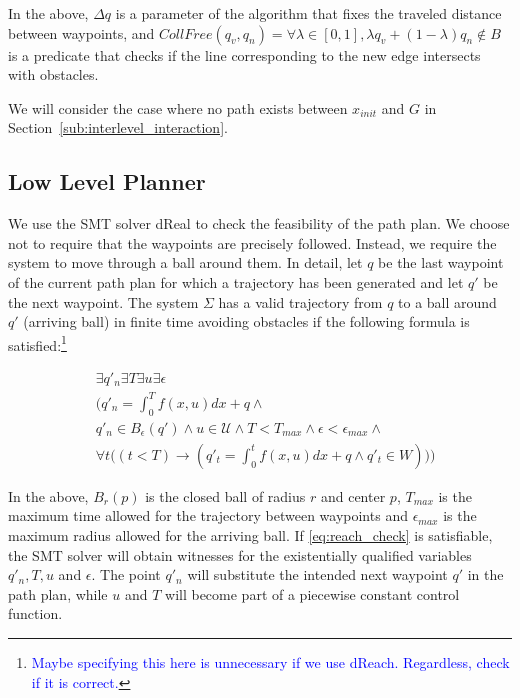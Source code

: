 \documentclass[12pt]{article}
\newcommand\fran[1]{\textcolor{blue}{#1}}
\newcommand\ffran[1]{\textcolor{blue}{\footnote{\fran{#1}}}}
\begin{document}
In the above, $\Delta q$ is a parameter of the algorithm that fixes the traveled distance between waypoints, and $CollFree(q_v, q_n) = \forall \lambda \in [0, 1], \lambda q_v + (1 - \lambda) q_n \notin B$ is a predicate that checks if the line corresponding to the new edge intersects with obstacles.

We will consider the case where no path exists between $x_{init}$ and $G$ in Section~\ref{sub:interlevel_interaction}.

\subsection{Low Level Planner}
\label{sub:low_level_planner}

We use the SMT solver dReal to check the feasibility of the path plan. We choose not to require that the waypoints are precisely followed. Instead, we require the system to move through a ball around them. In detail, let $q$ be the last waypoint of the current path plan for which a trajectory has been generated and let $q'$ be the next waypoint. The system $\Sigma$ has a valid trajectory from $q$ to a ball around $q'$ (arriving ball) in finite time avoiding obstacles if the following formula is satisfied:\ffran{Maybe specifying this here is unnecessary if we use dReach. Regardless, check if it is correct.}

\begin{equation}
    \label{eq:reach_check}
    \begin{split}
        &\exists q'_n \exists T \exists u \exists \epsilon \\
        &\bigg(
            q'_n = \int_{0}^{T} f(x, u) dx + q \land \\
        &q'_n \in B_{\epsilon}(q') \land 
            u \in \mathcal{U} \land
            T < T_{max} \land
            \epsilon < \epsilon_{max} \land \\
        &\forall t \Big((t < T) \rightarrow 
            (q'_t = \int_{0}^{t} f(x, u) dx + q \land 
            q'_t \in W )\Big)
        \bigg)
    \end{split}
\end{equation}

In the above, $B_r(p)$ is the closed ball of radius $r$ and center $p$, $T_{max}$ is the maximum time allowed for the trajectory between waypoints and $\epsilon_{max}$ is the maximum radius allowed for the arriving ball. If \eqref{eq:reach_check} is satisfiable, the SMT solver will obtain witnesses for the existentially qualified variables $q'_n, T, u$ and $\epsilon$. The point $q'_n$ will substitute the intended next waypoint $q'$ in the path plan, while $u$ and $T$ will become part of a piecewise constant control function.
\end{document}
